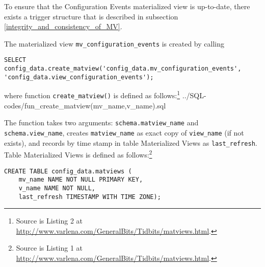 To ensure that the Configuration Events materialized view is up-to-date, there exists a trigger structure that is described in subsection \ref{integrity_and_consistency_of_MV}. 

The materialized view \texttt{mv\_configuration\_events} is created by calling  
\begin{lstlisting}[language=postgreSQL]
SELECT config_data.create_matview('config_data.mv_configuration_events', 'config_data.view_configuration_events');
\end{lstlisting}
where function \texttt{create\_matview()} is defined as follows:\footnote{Source is Listing 2 at \url{http://www.varlena.com/GeneralBits/Tidbits/matviews.html}.} 
%
{../SQL-codes/fun_create_matview(mv_name,v_name).sql}

The function takes two arguments: \texttt{schema.matview\_name} and \texttt{schema.view\_name}, 
creates \texttt{matview\_name} as exact copy of \texttt{view\_name} (if not exists), and records by time stamp in table Materialized Views as \texttt{last\_refresh}.
Table Materialized Views is defined as follows:\footnote{Source is Listing 1 at \url{http://www.varlena.com/GeneralBits/Tidbits/matviews.html}.}
\begin{lstlisting}[language=postgreSQL] 
CREATE TABLE config_data.matviews ( 
	mv_name NAME NOT NULL PRIMARY KEY, 
	v_name NAME NOT NULL,  
	last_refresh TIMESTAMP WITH TIME ZONE);
\end{lstlisting}


% 
% 



